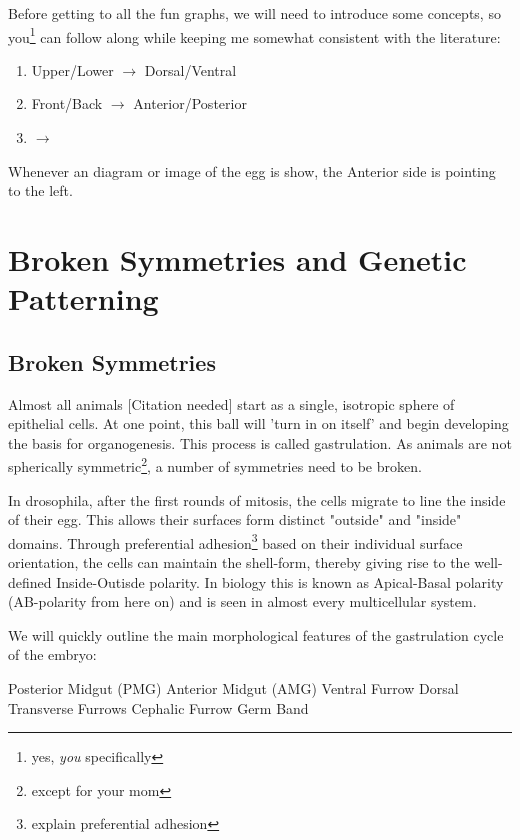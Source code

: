 Before getting to all the fun graphs, we will need to introduce some concepts, so you\footnote{yes, \textit{you} specifically} can follow along while keeping me somewhat consistent with the literature:

\begin{enumerate}
    \item Upper/Lower $\rightarrow$ Dorsal/Ventral
    \item Front/Back  $\rightarrow$ Anterior/Posterior
    \item   $\rightarrow$
\end{enumerate}

Whenever an diagram or image of the egg is show, the Anterior side is pointing to the left.

\section{Broken Symmetries and Genetic Patterning}
\label{sec:theory-polarity}
\subsection{Broken Symmetries}

Almost all animals [Citation needed] start as a single, isotropic sphere of epithelial cells. At one point, this ball will 'turn in on itself' and begin developing the basis for organogenesis. This process is called gastrulation. As animals are not spherically symmetric\footnote{except for your mom}, a number of symmetries need to be broken. 

In drosophila, after the first rounds of mitosis, the cells migrate to line the inside of their egg. This allows their surfaces form distinct "outside" and "inside" domains. Through preferential adhesion\footnote{explain  preferential adhesion} based on their individual surface orientation, the cells can maintain the shell-form, thereby giving rise to the well-defined Inside-Outisde polarity. In biology this is known as Apical-Basal polarity (AB-polarity from here on) and is seen in almost every multicellular system. 

We will quickly outline the main morphological features of the gastrulation cycle of the embryo:
\begin{outline}
    \1 Posterior Midgut (PMG)
    \1 Anterior Midgut (AMG)
    \1 Ventral Furrow
    \1 Dorsal Transverse Furrows
    \1 Cephalic Furrow
    \1 Germ Band
\end{outline}

